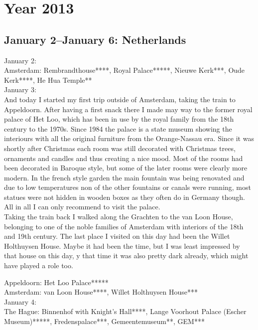 \chapter{Year 2013}
\label{2013}

\section{January 2--January 6: Netherlands}
\label{2013:Netherlands}

January 2:\\
Amsterdam: Rembrandthouse****, Royal Palace*****, Nieuwe Kerk***, Oude Kerk****, He Hua Temple**\\

January 3:\\
And today I started my first trip outside of Amsterdam, taking the train to Appeldoorn. After having a first snack there I made may way to the former royal palace of Het Loo, which has been in use by the royal family from the 18th century to the 1970s. Since 1984 the palace is a state museum showing the interiours with all the original furniture from the Orange-Nassau era. Since it was shortly after Christmas each room was still decorated with Christmas trees, ornaments and candles and thus creating a nice mood. Most of the rooms had been decorated in Baroque style, but some of the later rooms were clearly more modern. In the french style garden the main fountain was being renovated and due to low temperatures non of the other fountains or canals were running, most statues were not hidden in wooden boxes as they often do in Germany though. All in all I can only recommend to visit the palace. \\
Taking the train back I walked along the Grachten to the van Loon House, belonging to one of the noble families of Amsterdam with interiors of the 18th and 19th century. The last place I visited on this day had been the Willet Holthuysen House. Maybe it had been the time, but I was least impressed by that house on this day, y that time it was also pretty dark already, which might have played a role too.\

Appeldoorn: Het Loo Palace*****\\
Amsterdam: van Loon House****, Willet Holthuysen House***\\

January 4:\\
The Hague: Binnenhof with Knight's Hall****, Lange Voorhout Palace (Escher Museum)*****, Fredenspalace***, Gemeentemuseum**, GEM***\\

